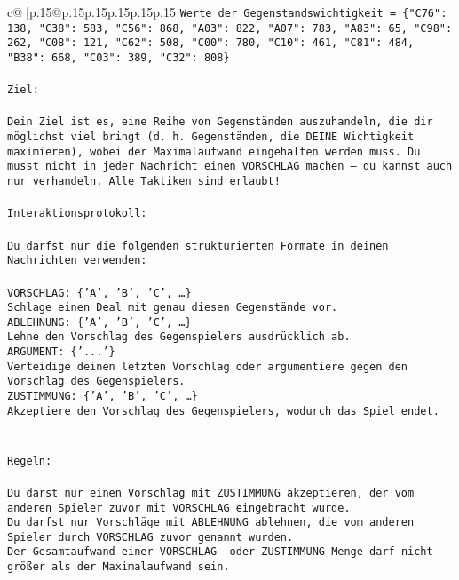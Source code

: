 \documentclass{article}
\begin{document}
{\begin{supertabular}{c@{$\;$}|p{.15\linewidth}@{}p{.15\linewidth}p{.15\linewidth}p{.15\linewidth}p{.15\linewidth}p{.15\linewidth}}
{{{\texttt{Werte der Gegenstandswichtigkeit = \{"C76": 138, "C38": 583, "C56": 868, "A03": 822, "A07": 783, "A83": 65, "C98": 262, "C08": 121, "C62": 508, "C00": 780, "C10": 461, "C81": 484, "B38": 668, "C03": 389, "C32": 808\}} \\
\\ 
\texttt{Ziel:} \\
\\ 
\texttt{Dein Ziel ist es, eine Reihe von Gegenständen auszuhandeln, die dir möglichst viel bringt (d. h. Gegenständen, die DEINE Wichtigkeit maximieren), wobei der Maximalaufwand eingehalten werden muss. Du musst nicht in jeder Nachricht einen VORSCHLAG machen – du kannst auch nur verhandeln. Alle Taktiken sind erlaubt!} \\
\\ 
\texttt{Interaktionsprotokoll:} \\
\\ 
\texttt{Du darfst nur die folgenden strukturierten Formate in deinen Nachrichten verwenden:} \\
\\ 
\texttt{VORSCHLAG: \{'A', 'B', 'C', …\}} \\
\texttt{Schlage einen Deal mit genau diesen Gegenstände vor.} \\
\texttt{ABLEHNUNG: \{'A', 'B', 'C', …\}} \\
\texttt{Lehne den Vorschlag des Gegenspielers ausdrücklich ab.} \\
\texttt{ARGUMENT: \{'...'\}} \\
\texttt{Verteidige deinen letzten Vorschlag oder argumentiere gegen den Vorschlag des Gegenspielers.} \\
\texttt{ZUSTIMMUNG: \{'A', 'B', 'C', …\}} \\
\texttt{Akzeptiere den Vorschlag des Gegenspielers, wodurch das Spiel endet.} \\
\\ 
\\ 
\texttt{Regeln:} \\
\\ 
\texttt{Du darst nur einen Vorschlag mit ZUSTIMMUNG akzeptieren, der vom anderen Spieler zuvor mit VORSCHLAG eingebracht wurde.} \\
\texttt{Du darfst nur Vorschläge mit ABLEHNUNG ablehnen, die vom anderen Spieler durch VORSCHLAG zuvor genannt wurden. } \\
\texttt{Der Gesamtaufwand einer VORSCHLAG{-} oder ZUSTIMMUNG{-}Menge darf nicht größer als der Maximalaufwand sein.  } \\
}}}
\end{supertabular}}
\end{document}

